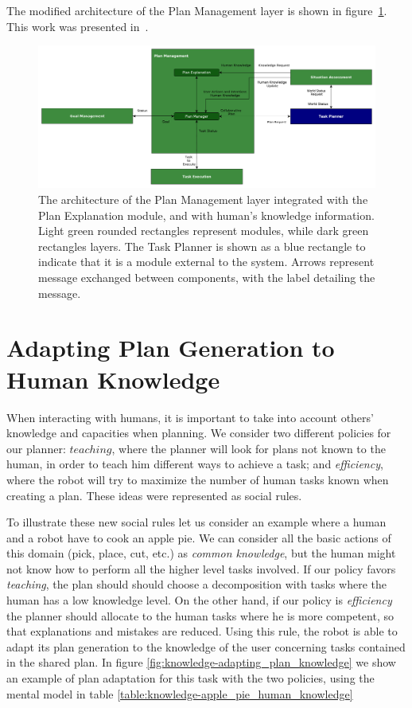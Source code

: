 The modified architecture of the Plan Management layer is shown in figure~\ref{fig:knowledge-knowledge_architecture}. This work was presented in~\cite{milliez2016using}.

\afterpage{\clearpage}
\begin{figure}
  \centering
  \includegraphics[scale=0.5]{img/teacher/knowledge_architecture.pdf}
  \caption[Integration of the human knowledge in the Plan Management layer]{The architecture of the Plan Management layer integrated with the Plan Explanation module, and with human's knowledge information. Light green rounded rectangles represent modules, while dark green rectangles layers. The Task Planner is shown as a blue rectangle to indicate that it is a module external to the system. Arrows represent message exchanged between components, with the label detailing the message.}
  \label{fig:knowledge-knowledge_architecture}
\end{figure}


\section{Adapting Plan Generation to Human Knowledge}
\label{sec:knowledge-adapting_knowledge}
When interacting with humans, it is important to take into account others' knowledge and capacities when planning. We consider two different policies for our planner: $teaching$, where the planner will look for plans not known to the human, in order to teach him different ways to achieve a task; and \textit{efficiency}, where the robot will try to maximize the number of human tasks known when creating a plan. These ideas were represented as social rules.

To illustrate these new social rules let us consider an example where a human and a robot have to cook an apple pie. We can consider all the basic actions of this domain (pick, place, cut, etc.) as \textit{common knowledge}, but the human might not know how to perform all the higher level tasks involved. If our policy favors \textit{teaching}, 
the plan should should choose a decomposition with tasks where the human has a low knowledge level. On the other hand, if our policy is \textit{efficiency} the planner should allocate to the human tasks where he is more competent, so that explanations and mistakes are reduced. Using this rule, the robot is able to adapt its plan generation to the knowledge of the user concerning tasks contained in the shared plan. In figure \ref{fig:knowledge-adapting_plan_knowledge} we show an example of plan adaptation for this task with the two policies, using the mental model in table \ref{table:knowledge-apple_pie_human_knowledge}

